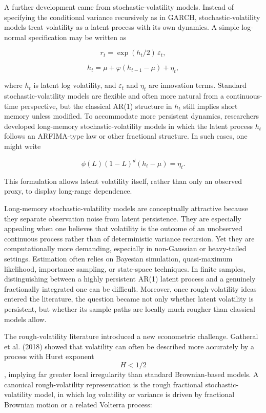 \documentclass[12pt]{article}
\begin{document}
A further development came from stochastic-volatility models. Instead of specifying the conditional variance recursively as in GARCH, stochastic-volatility models treat volatility as a latent process with its own dynamics. A simple log-normal specification may be written as

\[r_t = \exp(h_t/2)\,\varepsilon_t,\]

\[h_t = \mu + \varphi(h_{t-1}-\mu) + \eta_t,\]

where $h_t$ is latent log volatility, and $\varepsilon_t$ and $\eta_t$ are innovation terms. Standard stochastic-volatility models are flexible and often more natural from a continuous-time perspective, but the classical AR(1) structure in $h_t$ still implies short memory unless modified. To accommodate more persistent dynamics, researchers developed long-memory stochastic-volatility models in which the latent process $h_t$ follows an ARFIMA-type law or other fractional structure. In such cases, one might write

\[\phi(L)(1-L)^d(h_t - \mu) = \eta_t.\]

This formulation allows latent volatility itself, rather than only an observed proxy, to display long-range dependence.

Long-memory stochastic-volatility models are conceptually attractive because they separate observation noise from latent persistence. They are especially appealing when one believes that volatility is the outcome of an unobserved continuous process rather than of deterministic variance recursion. Yet they are computationally more demanding, especially in non-Gaussian or heavy-tailed settings. Estimation often relies on Bayesian simulation, quasi-maximum likelihood, importance sampling, or state-space techniques. In finite samples, distinguishing between a highly persistent AR(1) latent process and a genuinely fractionally integrated one can be difficult. Moreover, once rough-volatility ideas entered the literature, the question became not only whether latent volatility is persistent, but whether its sample paths are locally much rougher than classical models allow.

The rough-volatility literature introduced a new econometric challenge. Gatheral et al. (2018) showed that volatility can often be described more accurately by a process with Hurst exponent $$H<1/2$$, implying far greater local irregularity than standard Brownian-based models. A canonical rough-volatility representation is the rough fractional stochastic-volatility model, in which log volatility or variance is driven by fractional Brownian motion or a related Volterra process:
\end{document}

